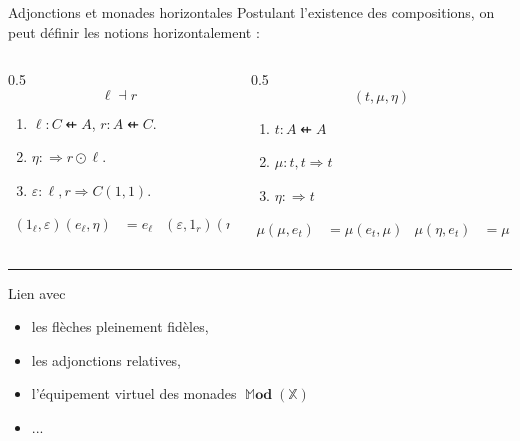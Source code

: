 \documentclass[9pt]{beamer}
\newcommand{\bb}[1]{\mathbb{#1}}
\newcommand{\To}{\Rightarrow}
\newcommand{\dfrom}{\nvleftarrow}
\DeclareMathOperator{\Mod}{\bb{M}\textbf{od}}
\begin{document}
\begin{frame}{Adjonctions et monades horizontales}
    Postulant l'existence des compositions, on peut définir les notions horizontalement :
    \begin{columns}[T]
        \begin{column}{0.5\textwidth}
            \[\ell \dashv r\]
            \begin{enumerate}
                \item $\ell : C \dfrom A$, $r : A \dfrom C$.
                \item $\eta : \To r\odot\ell$.
                \item $\varepsilon : \ell, r\To C(1, 1)$.
            \end{enumerate}
            \begin{align*}
                (1_\ell, \varepsilon)(e_\ell, \eta) &= e_\ell & (\varepsilon, 1_r)(\eta, e_r) = e_r
            \end{align*}
        \end{column}
        \vrule{}
        \begin{column}{0.5\textwidth}
            \[(t, \mu, \eta)\]
            \begin{enumerate}
                \item $t : A \dfrom A$
                \item $\mu : t, t\To t$
                \item $\eta : \To t$
            \end{enumerate}
            \begin{align*}
                \mu(\mu, e_t) &= \mu(e_t, \mu) & \mu(\eta, e_t) &= \mu(e_t, \eta) = e_t
            \end{align*}
        \end{column}
    \end{columns}
    \pause
    \vspace{\baselineskip}
    \hrule
    \vspace{\baselineskip}
    Lien avec
    \begin{itemize}
        \item les flèches pleinement fidèles,
        \item les adjonctions relatives,
        \item l'équipement virtuel des monades $\Mod(\bb X)$
        \item ...
    \end{itemize}
\end{frame}
\end{document}
